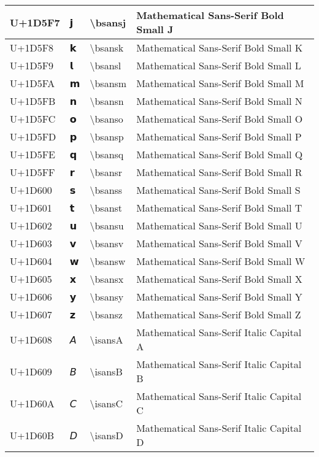 \begin{table}[h]
\begin{tabulary}{\linewidth}{|L|L|L|L|}
\hline
U+1D5F7 & 𝗷 & {\textbackslash}bsansj & Mathematical Sans-Serif Bold Small J \\
\hline
U+1D5F8 & 𝗸 & {\textbackslash}bsansk & Mathematical Sans-Serif Bold Small K \\
\hline
U+1D5F9 & 𝗹 & {\textbackslash}bsansl & Mathematical Sans-Serif Bold Small L \\
\hline
U+1D5FA & 𝗺 & {\textbackslash}bsansm & Mathematical Sans-Serif Bold Small M \\
\hline
U+1D5FB & 𝗻 & {\textbackslash}bsansn & Mathematical Sans-Serif Bold Small N \\
\hline
U+1D5FC & 𝗼 & {\textbackslash}bsanso & Mathematical Sans-Serif Bold Small O \\
\hline
U+1D5FD & 𝗽 & {\textbackslash}bsansp & Mathematical Sans-Serif Bold Small P \\
\hline
U+1D5FE & 𝗾 & {\textbackslash}bsansq & Mathematical Sans-Serif Bold Small Q \\
\hline
U+1D5FF & 𝗿 & {\textbackslash}bsansr & Mathematical Sans-Serif Bold Small R \\
\hline
U+1D600 & 𝘀 & {\textbackslash}bsanss & Mathematical Sans-Serif Bold Small S \\
\hline
U+1D601 & 𝘁 & {\textbackslash}bsanst & Mathematical Sans-Serif Bold Small T \\
\hline
U+1D602 & 𝘂 & {\textbackslash}bsansu & Mathematical Sans-Serif Bold Small U \\
\hline
U+1D603 & 𝘃 & {\textbackslash}bsansv & Mathematical Sans-Serif Bold Small V \\
\hline
U+1D604 & 𝘄 & {\textbackslash}bsansw & Mathematical Sans-Serif Bold Small W \\
\hline
U+1D605 & 𝘅 & {\textbackslash}bsansx & Mathematical Sans-Serif Bold Small X \\
\hline
U+1D606 & 𝘆 & {\textbackslash}bsansy & Mathematical Sans-Serif Bold Small Y \\
\hline
U+1D607 & 𝘇 & {\textbackslash}bsansz & Mathematical Sans-Serif Bold Small Z \\
\hline
U+1D608 & 𝘈 & {\textbackslash}isansA & Mathematical Sans-Serif Italic Capital A \\
\hline
U+1D609 & 𝘉 & {\textbackslash}isansB & Mathematical Sans-Serif Italic Capital B \\
\hline
U+1D60A & 𝘊 & {\textbackslash}isansC & Mathematical Sans-Serif Italic Capital C \\
\hline
U+1D60B & 𝘋 & {\textbackslash}isansD & Mathematical Sans-Serif Italic Capital D \\

\end{tabulary}
\end{table}
